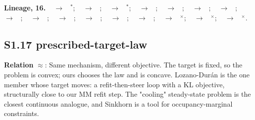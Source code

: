 \documentclass[10pt]{article}
\newcommand{\memb}[1]{\par\smallskip\textbf{#1}\quad}
\begin{document}
\memb{Lineage, 16.} {\footnotesize \citeauthor{Wiener-extrapolation49}~\citeyear{Wiener-extrapolation49} $\to$ \citeauthor{Astrom-computer67}~\citeyear{Astrom-computer67}$^\ast$; \citeauthor{Astrom-computer67}~\citeyear{Astrom-computer67} $\to$ \citeauthor{Astrom-self73}~\citeyear{Astrom-self73}; \citeauthor{Astrom-computer67}~\citeyear{Astrom-computer67} $\to$ \citeauthor{Harris-assessment89}~\citeyear{Harris-assessment89}$^\ast$; \citeauthor{Astrom-self73}~\citeyear{Astrom-self73} $\to$ \citeauthor{Singh-finite23}~\citeyear{Singh-finite23}; \citeauthor{Karny-towards96}~\citeyear{Karny-towards96} $\to$ \citeauthor{Karny-fully06}~\citeyear{Karny-fully06}; \citeauthor{Wang-robust99}~\citeyear{Wang-robust99} $\to$ \citeauthor{Wang-minimum02}~\citeyear{Wang-minimum02}; \citeauthor{Wang-minimum02}~\citeyear{Wang-minimum02} $\to$ \citeauthor{Yue-minimum03}~\citeyear{Yue-minimum03}; \citeauthor{Yue-minimum03}~\citeyear{Yue-minimum03} $\to$ \citeauthor{Yue-minimum06}~\citeyear{Yue-minimum06}; \citeauthor{Yue-minimum03}~\citeyear{Yue-minimum03} $\to$ \citeauthor{Ren-minimum12}~\citeyear{Ren-minimum12}; \citeauthor{Yue-minimum03}~\citeyear{Yue-minimum03} $\to$ \citeauthor{Ren-introductory19}~\citeyear{Ren-introductory19}; \citeauthor{Yue-minimum06}~\citeyear{Yue-minimum06} $\to$ \citeauthor{Zhou-nongaussian18}~\citeyear{Zhou-nongaussian18}; \citeauthor{Karny-fully06}~\citeyear{Karny-fully06} $\to$ \citeauthor{Garrabe-probabilistic22}~\citeyear{Garrabe-probabilistic22}; \citeauthor{Karny-fully06}~\citeyear{Karny-fully06} $\to$ \citeauthor{Lefebvre-probabilistic24}~\citeyear{Lefebvre-probabilistic24}; \citeauthor{Todorov-general08}~\citeyear{Todorov-general08} $\to$ \citeauthor{Garrabe-probabilistic22}~\citeyear{Garrabe-probabilistic22}$^\times$; \citeauthor{Todorov-general08}~\citeyear{Todorov-general08} $\to$ \citeauthor{Lefebvre-probabilistic24}~\citeyear{Lefebvre-probabilistic24}$^\times$; \citeauthor{Todorov-efficient09}~\citeyear{Todorov-efficient09} $\to$ \citeauthor{Karny-fully06}~\citeyear{Karny-fully06}$^\times$.}

\subsection{S1.17 prescribed-target-law}\label{node:S1-S1-17-prescribed-target-law}
\textbf{Relation} $\approx$: Same mechanism, different objective. The target is fixed, so the problem is convex; ours chooses the law and is concave. Lozano-Dur\'an is the one member whose target moves: a refit-then-steer loop with a KL objective, structurally close to our MM refit step. The "cooling" steady-state problem is the closest continuous analogue, and Sinkhorn is a tool for occupancy-marginal constraints.
\end{document}
